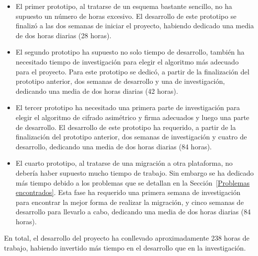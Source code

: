 \begin{itemize}
  \item El primer prototipo, al tratarse de un esquema bastante sencillo, no ha supuesto un número de horas excesivo. El desarrollo de este prototipo se finalizó a las dos semanas de iniciar el proyecto, habiendo dedicado una media de dos horas diarias (28 horas).

  \item El segundo prototipo ha supuesto no solo tiempo de desarrollo, también ha necesitado tiempo de investigación para elegir el algoritmo más adecuado para el proyecto. Para este prototipo se dedicó, a partir de la finalización del prototipo anterior, dos semanas de desarrollo y una de investigación, dedicando una media de dos horas diarias (42 horas).

  \item El tercer prototipo ha necesitado una primera parte de investigación para elegir el algoritmo de cifrado asimétrico y firma adecuados y luego una parte de desarrollo. El desarrollo de este prototipo ha requerido, a partir de la finalización del prototipo anterior, dos semanas de investigación y cuatro de desarrollo, dedicando una media de dos horas diarias (84 horas).

  \item El cuarto prototipo, al tratarse de una migración a otra plataforma, no debería haber supuesto mucho tiempo de trabajo. Sin embargo se ha dedicado más tiempo debido a los problemas que se detallan en la Sección~\ref{Problemas encontrados}. Esta fase ha requerido una primera semana de investigación para encontrar la mejor forma de realizar la migración, y cinco semanas de desarrollo para llevarlo a cabo, dedicando una media de dos horas diarias (84 horas).
\end{itemize}

En total, el desarrollo del proyecto ha conllevado aproximadamente 238 horas de trabajo, habiendo invertido más tiempo en el desarrollo que en la investigación.

